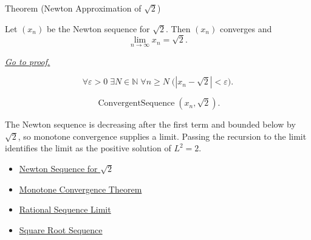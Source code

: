 
\begin{theorembox}{Theorem (Newton Approximation of $\sqrt{2}$)}
\begin{theorem}
\label{thm:newton-approximation-sqrt-two}
Let $(x_n)$ be the Newton sequence for $\sqrt{2}$. Then $(x_n)$ converges
and
\[
  \lim_{n\to\infty}x_n=\sqrt{2}.
\]

\smallskip
\noindent
\hyperref[prf:newton-approximation-sqrt-two]{\textit{Go to proof.}}
\end{theorem}
\end{theorembox}

\begin{remark*}
\[
\forall \varepsilon>0\;\exists N\in\mathbb{N}\;\forall n\ge N
\;\bigl(|x_n-\sqrt{2}|<\varepsilon\bigr).
\]
\end{remark*}

\begin{remark*}
\[
\operatorname{ConvergentSequence}(x_n,\sqrt{2}).
\]
\end{remark*}

\begin{remark*}[Interpretation]
The Newton sequence is decreasing after the first term and bounded below by
$\sqrt{2}$, so monotone convergence supplies a limit. Passing the recursion
to the limit identifies the limit as the positive solution of $L^2=2$.
\end{remark*}

\begin{remark*}[Dependencies]\hfill
\begin{itemize}
  \item \hyperref[def:newton-sequence-sqrt-two]{Newton Sequence for $\sqrt{2}$}
  \item \hyperref[thm:monotone-convergence-theorem]{Monotone Convergence Theorem}
  \item \hyperref[thm:rational-sequence-limit]{Rational Sequence Limit}
  \item \hyperref[def:square-root-sequence]{Square Root Sequence}
\end{itemize}
\end{remark*}


